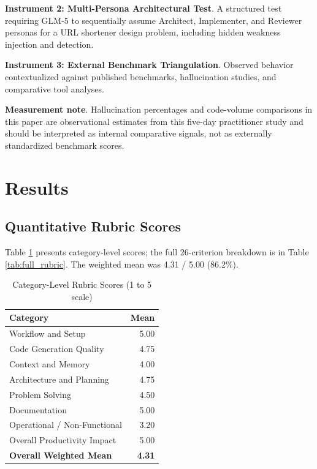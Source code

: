 \documentclass[conference]{IEEEtran}
\begin{document}
\textbf{Instrument 2: Multi-Persona Architectural Test}. A structured test requiring GLM-5 to sequentially assume Architect, Implementer, and Reviewer personas for a URL shortener design problem, including hidden weakness injection and detection.

\textbf{Instrument 3: External Benchmark Triangulation}. Observed behavior contextualized against published benchmarks, hallucination studies, and comparative tool analyses.

\textbf{Measurement note}. Hallucination percentages and code-volume comparisons in this paper are observational estimates from this five-day practitioner study and should be interpreted as internal comparative signals, not as externally standardized benchmark scores.

\section{Results}

\subsection{Quantitative Rubric Scores}
Table \ref{tab:category_scores} presents category-level scores; the full 26-criterion breakdown is in Table \ref{tab:full_rubric}. The weighted mean was 4.31 / 5.00 (86.2\%).

\begin{table}[t]
\caption{Category-Level Rubric Scores (1 to 5 scale)}
\label{tab:category_scores}
\centering
\setlength{\tabcolsep}{4pt}
\begin{tabular}{@{}lr@{}}
\toprule
\textbf{Category} & \textbf{Mean} \\
\midrule
Workflow and Setup & 5.00 \\
Code Generation Quality & 4.75 \\
Context and Memory & 4.00 \\
Architecture and Planning & 4.75 \\
Problem Solving & 4.50 \\
Documentation & 5.00 \\
Operational / Non-Functional & 3.20 \\
Overall Productivity Impact & 5.00 \\
\midrule
\textbf{Overall Weighted Mean} & \textbf{4.31} \\
\bottomrule
\end{tabular}
\end{table}
\end{document}
